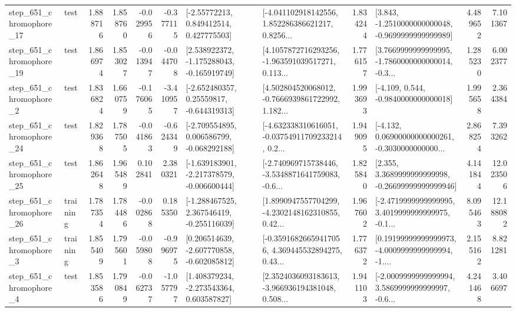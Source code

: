 \begin{tabular}{llrrrrllrlrr}
  step\_651\_chromophore\_17 &      test &      1.888716 &    1.858760 &     -0.029956 & -0.377115 &     [-2.55772213, 0.849412514, 0.427775503] &  [-4.041102918142556, 1.852286386621217, 0.8256... &       1.834244 &  [3.843, -1.2510000000000048, -0.9699999999999989] &            4.489652 &          7.101367 \\
  step\_651\_chromophore\_19 &      test &      1.866974 &    1.853027 &     -0.013947 & -0.044708 &   [2.538922372, -1.175288043, -0.165919749] &  [4.1057872716293256, -1.963591039517271, 0.113... &       1.776157 &  [3.7669999999999995, -1.7860000000000014, -0.3... &            1.285230 &          6.002377 \\
   step\_651\_chromophore\_2 &      test &      1.836824 &    1.660759 &     -0.176065 & -3.410957 &    [-2.652480357, 0.25559817, -0.644319313] &  [4.502804520068012, -0.7666939861722992, 1.182... &       1.993693 &               [-4.109, 0.544, -0.9840000000000018] &            1.995658 &          2.364384 \\
  step\_651\_chromophore\_24 &      test &      1.829368 &    1.787505 &     -0.041863 & -0.624349 &   [-2.709554895, 0.006586799, -0.068292188] &  [-4.632338310616051, -0.03754911709233214, 0.2... &       1.949095 &  [-4.132, 0.06900000000000261, -0.3030000000000... &            2.868254 &          7.393262 \\
  step\_651\_chromophore\_25 &      test &      1.862648 &    1.965489 &      0.102841 &  2.380321 &  [-1.639183901, -2.217378579, -0.006600444] &  [-2.740969715738446, -3.5348871641759083, -0.6... &       1.825840 &  [2.355, 3.3689999999999998, -0.26699999999999946] &            4.141844 &         12.023506 \\
  step\_651\_chromophore\_26 &  training &      1.787354 &    1.784486 &     -0.002868 &  0.185350 &   [-1.288467525, 2.367546419, -0.255116039] &  [1.8990947557704299, -4.2302148162310855, 0.42... &       1.967602 &  [-2.4719999999999995, 3.4019999999999975, -0.1... &            8.095463 &         12.188082 \\
   step\_651\_chromophore\_3 &  training &      1.855409 &    1.795601 &     -0.059808 & -0.996975 &   [0.206514639, -2.607770858, -0.602085812] &  [-0.35916826659417056, 4.369445532894275, 0.43... &       1.776372 &  [0.19199999999999973, -4.0009999999999994, -1.... &            2.155162 &          8.821281 \\
   step\_651\_chromophore\_4 &      test &      1.853586 &    1.790849 &     -0.062737 & -1.057797 &    [1.408379234, -2.273543364, 0.603587827] &  [2.3524036093183613, -3.966936194381048, 0.508... &       1.941103 &  [-2.0009999999999994, 3.5869999999999997, -0.6... &            4.241468 &          3.406697 \\

\end{tabular}
